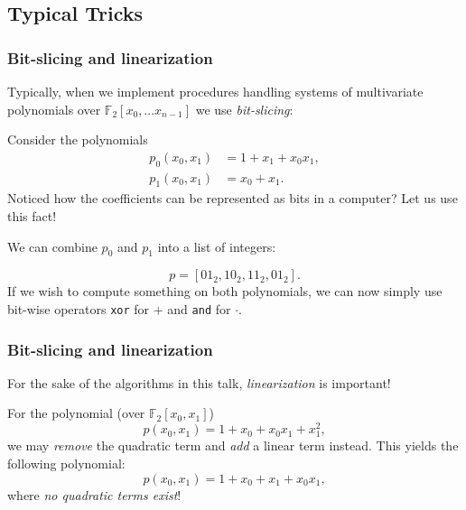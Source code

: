\documentclass{beamer}
\begin{document}
\subsection{Typical Tricks}
\begin{frame}
    \frametitle{Bit-slicing and linearization}
    Typically, when we implement procedures handling systems of multivariate polynomials over $\mathbb{F}_2[x_0,\dots x_{n - 1}]$ we use \textit{bit-slicing}: \pause

    Consider the polynomials 
    \begin{equation*}
        \begin{split}
            p_0(x_0, x_1) &= 1 + x_1 + x_0x_1,\\
            p_1(x_0, x_1) &= x_0 + x_1.
        \end{split}
    \end{equation*}
    Noticed how the coefficients can be represented as bits in a computer? Let us use this fact!

    We can combine $p_0$ and $p_1$ into a list of integers:
    
    \pause
    $$
        p = [01_2, 10_2, 11_2, 01_2].
    $$
    If we wish to compute something on both polynomials, we can now simply use bit-wise operators \texttt{xor} for $+$ and \texttt{and} for $\cdot$.
\end{frame}

\begin{frame}
    \frametitle{Bit-slicing and linearization}
    For the sake of the algorithms in this talk, \textit{linearization} is important! \pause

    For the polynomial (over $\mathbb{F}_2[x_0,x_1]$) 
    $$
        p(x_0, x_1) = 1 + x_0 + x_0x_1 + x_1^2, 
    $$
    we may \textit{remove} the quadratic term and \textit{add} a linear term instead. This yields the following polynomial:
    $$
        p(x_0, x_1) = 1 + x_0 + x_1 + x_0x_1,
    $$
    where \textit{no quadratic terms exist}!
\end{frame}
\end{document}
